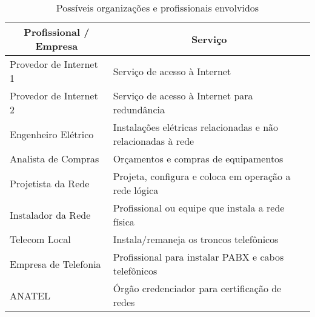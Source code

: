 \begin{table}[h!]
	\centering
	\renewcommand{\arraystretch}{2.0}
\caption{Possíveis organizações e profissionais envolvidos}
\label{tab1}
	\begin{tabular}{|l|l|}
		\hline
		\multicolumn{1}{|c|}{\textbf{Profissional / Empresa}} &	 \multicolumn{1}{|c|}{\textbf{Serviço}}                                 		  \\ \hline		Provedor de Internet 1                                
		& Serviço de acesso à Internet                                              \\ \hline
	    Provedor de Internet 2                               
	    & Serviço de acesso à Internet para redundância            					\\ \hline
		Engenheiro Elétrico                                  
		& Instalações elétricas relacionadas e não relacionadas à rede          \\ \hline
		Analista de Compras 
        & Orçamentos e compras de equipamentos          \\ \hline
		Projetista da Rede                                   
		& Projeta, configura e coloca em operação a rede lógica    \\ \hline
		Instalador da Rede                                   
		& Profissional ou equipe que instala a rede física           \\ \hline
		Telecom Local                                        
		& Instala/remaneja os troncos telefônicos         \\ \hline
		Empresa de Telefonia                                    
		& Profissional para instalar PABX e cabos telefônicos    \\ \hline
		ANATEL                                  
		& Órgão credenciador para certificação de redes \\ \hline
	\end{tabular}
\end{table}

